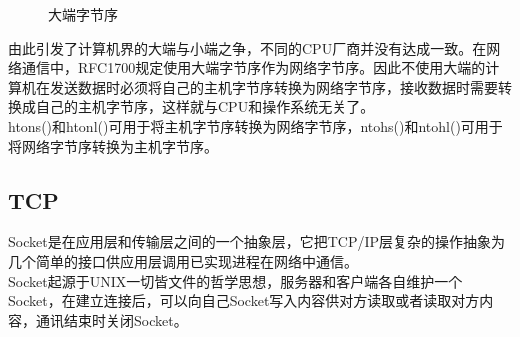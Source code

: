 \begin{figure}[H]
    \centering
    \caption{大端字节序}
\end{figure}

由此引发了计算机界的大端与小端之争，不同的CPU厂商并没有达成一致。在网络通信中，RFC1700规定使用大端字节序作为网络字节序。因此不使用大端的计算机在发送数据时必须将自己的主机字节序转换为网络字节序，接收数据时需要转换成自己的主机字节序，这样就与CPU和操作系统无关了。\\

htons()和htonl()可用于将主机字节序转换为网络字节序，ntohs()和ntohl()可用于将网络字节序转换为主机字节序。\\

\subsection{TCP}

Socket是在应用层和传输层之间的一个抽象层，它把TCP/IP层复杂的操作抽象为几个简单的接口供应用层调用已实现进程在网络中通信。\\

Socket起源于UNIX一切皆文件的哲学思想，服务器和客户端各自维护一个Socket，在建立连接后，可以向自己Socket写入内容供对方读取或者读取对方内容，通讯结束时关闭Socket。\\


